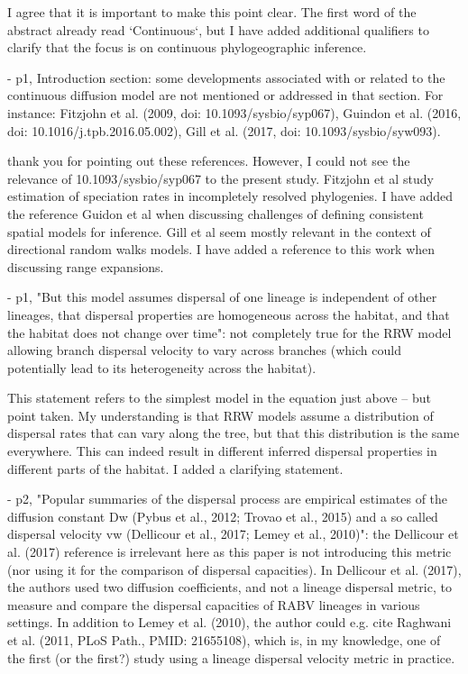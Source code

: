 \documentclass[11pt, oneside]{article}   	%
\newcommand{\response}[1]{{\color{black}{\bf Response:} #1}}
\begin{document}
\response{I agree that it is important to make this point clear. The first word of the abstract already read `Continuous`, but I have added additional qualifiers to clarify that the focus is on continuous phylogeographic inference.}

- p1, Introduction section: some developments associated with or related to the continuous diffusion model are not mentioned or addressed in that section. For instance: Fitzjohn et al. (2009, doi: 10.1093/sysbio/syp067), Guindon et al. (2016, doi: 10.1016/j.tpb.2016.05.002), Gill et al. (2017, doi: 10.1093/sysbio/syw093).

\response{thank you for pointing out these references. However, I could not see the relevance of 10.1093/sysbio/syp067 to the present study. Fitzjohn et al study estimation of speciation rates in incompletely resolved phylogenies. I have added the reference Guidon et al when discussing challenges of defining consistent spatial models for inference. Gill et al seem mostly relevant in the context of directional random walks models. I have added a reference to this work when discussing range expansions.}

- p1, "But this model assumes dispersal of one lineage is independent of other lineages, that dispersal properties are homogeneous across the habitat, and that the habitat does not change over time": not completely true for the RRW model allowing branch dispersal velocity to vary across branches (which could potentially lead to its heterogeneity across the habitat).

\response{This statement refers to the simplest model in the equation just above -- but point taken. My understanding is that RRW models assume a distribution of dispersal rates that can vary along the tree, but that this distribution is the same everywhere. This can indeed result in different inferred dispersal properties in different parts of the habitat. I added a clarifying statement. }


- p2, "Popular summaries of the dispersal process are empirical estimates of the diffusion constant Dw (Pybus et al., 2012; Trovao et al., 2015) and a so called dispersal velocity vw (Dellicour et al., 2017; Lemey et al., 2010)": the Dellicour et al. (2017) reference is irrelevant here as this paper is not introducing this metric (nor using it for the comparison of dispersal capacities). In Dellicour et al. (2017), the authors used two diffusion coefficients, and not a lineage dispersal metric, to measure and compare the dispersal capacities of RABV lineages in various settings. In addition to Lemey et al. (2010), the author could e.g. cite Raghwani et al. (2011, PLoS Path., PMID: 21655108), which is, in my knowledge, one of the first (or the first?) study using a lineage dispersal velocity metric in practice.
\end{document}
